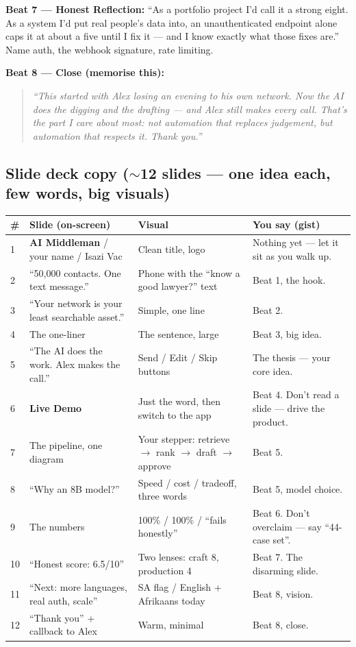 \documentclass[11pt, a4paper]{article}
\begin{document}
\textbf{Beat 7 --- Honest Reflection:} ``As a portfolio project I'd call it a strong eight. As a system I'd put real people's data into, an unauthenticated endpoint alone caps it at about a five until I fix it --- and I know exactly what those fixes are.'' Name auth, the webhook signature, rate limiting.

\textbf{Beat 8 --- Close (memorise this):}
\begin{quote}\itshape
``This started with Alex losing an evening to his own network. Now the AI does the digging and the drafting --- and Alex still makes every call. \quad[pause]\quad That's the part I care about most: not automation that replaces judgement, but automation that respects it. \quad Thank you.''
\end{quote}

\subsection{Slide deck copy ($\sim$12 slides --- one idea each, few words, big visuals)}
\begin{longtable}{@{}p{0.4cm}p{3.2cm}p{5cm}p{6cm}@{}}
\toprule
\# & Slide (on-screen) & Visual & You say (gist) \\
\midrule
\endhead
1 & \textbf{AI Middleman} / your name / Isazi Vac & Clean title, logo & Nothing yet --- let it sit as you walk up. \\
2 & ``50,000 contacts. One text message.'' & Phone with the ``know a good lawyer?'' text & Beat 1, the hook. \\
3 & ``Your network is your least searchable asset.'' & Simple, one line & Beat 2. \\
4 & The one-liner & The sentence, large & Beat 3, big idea. \\
5 & ``The AI does the work. Alex makes the call.'' & Send / Edit / Skip buttons & The thesis --- your core idea. \\
6 & \textbf{Live Demo} & Just the word, then switch to the app & Beat 4. Don't read a slide --- drive the product. \\
7 & The pipeline, one diagram & Your stepper: retrieve $\to$ rank $\to$ draft $\to$ approve & Beat 5. \\
8 & ``Why an 8B model?'' & Speed / cost / tradeoff, three words & Beat 5, model choice. \\
9 & The numbers & 100\% / 100\% / ``fails honestly'' & Beat 6. Don't overclaim --- say ``44-case set''. \\
10 & ``Honest score: 6.5/10'' & Two lenses: craft 8, production 4 & Beat 7. The disarming slide. \\
11 & ``Next: more languages, real auth, scale'' & SA flag / English + Afrikaans today & Beat 8, vision. \\
12 & ``Thank you'' + callback to Alex & Warm, minimal & Beat 8, close. \\
\bottomrule
\end{longtable}
\end{document}
